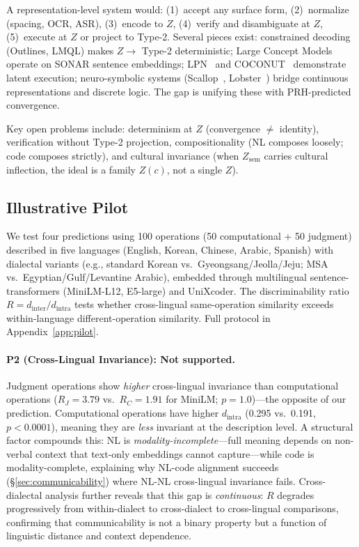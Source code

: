 \documentclass[11pt]{article}
\theoremstyle{definition}
\newcommand{\Zsem}{Z_{\text{sem}}}
\begin{document}
A representation-level system would: (1)~accept any surface form, (2)~normalize (spacing, OCR, ASR), (3)~encode to $Z$, (4)~verify and disambiguate at $Z$, (5)~execute at $Z$ or project to Type-2. Several pieces exist: constrained decoding (Outlines, LMQL) makes $Z \to$ Type-2 deterministic; Large Concept Models~\cite{meta2024lcm} operate on SONAR sentence embeddings; LPN~\cite{macfarlane2025lpn} and COCONUT~\cite{hao2024coconut} demonstrate latent execution; neuro-symbolic systems (Scallop~\cite{li2023scallop}, Lobster~\cite{huang2026lobster}) bridge continuous representations and discrete logic. The gap is unifying these with PRH-predicted convergence.

Key open problems include: determinism at $Z$ (convergence $\neq$ identity), verification without Type-2 projection, compositionality (NL composes loosely; code composes strictly), and cultural invariance (when $\Zsem$ carries cultural inflection, the ideal is a family $Z(c)$, not a single $Z$).

\subsection{Illustrative Pilot}\label{sec:pilot}

We test four predictions using 100 operations (50 computational + 50 judgment) described in five languages (English, Korean, Chinese, Arabic, Spanish) with dialectal variants (e.g., standard Korean vs.\ Gyeongsang/Jeolla/Jeju; MSA vs.\ Egyptian/Gulf/Levantine Arabic), embedded through multilingual sentence-transformers (MiniLM-L12, E5-large) and UniXcoder. The discriminability ratio $R = d_{\text{inter}}/d_{\text{intra}}$ tests whether cross-lingual same-operation similarity exceeds within-language different-operation similarity. Full protocol in Appendix~\ref{app:pilot}.

\paragraph{P2 (Cross-Lingual Invariance): Not supported.}
Judgment operations show \emph{higher} cross-lingual invariance than computational operations ($R_J = 3.79$ vs.\ $R_C = 1.91$ for MiniLM; $p=1.0$)---the opposite of our prediction. Computational operations have higher $d_{\text{intra}}$ (0.295 vs.\ 0.191, $p < 0.0001$), meaning they are \emph{less} invariant at the description level. A structural factor compounds this: NL is \emph{modality-incomplete}---full meaning depends on non-verbal context that text-only embeddings cannot capture---while code is modality-complete, explaining why NL-code alignment succeeds (\S\ref{sec:communicability}) where NL-NL cross-lingual invariance fails. Cross-dialectal analysis further reveals that this gap is \emph{continuous}: $R$ degrades progressively from within-dialect to cross-dialect to cross-lingual comparisons, confirming that communicability is not a binary property but a function of linguistic distance and context dependence.
\end{document}
